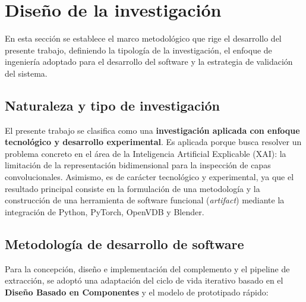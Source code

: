 \section{Diseño de la investigación}

En esta sección se establece el marco metodológico que rige el desarrollo del presente trabajo, definiendo la 
tipología de la investigación, el enfoque de ingeniería adoptado para el desarrollo del software y la estrategia 
de validación del sistema.

\subsection{Naturaleza y tipo de investigación}
El presente trabajo se clasifica como una \textbf{investigación aplicada con enfoque tecnológico y desarrollo 
experimental}. Es aplicada porque busca resolver un problema concreto en el área de la Inteligencia Artificial 
Explicable (XAI): la limitación de la representación bidimensional para la inspección de capas convolucionales. 
Asimismo, es de carácter tecnológico y experimental, ya que el resultado principal consiste en la formulación 
de una metodología y la construcción de una herramienta de software funcional (\textit{artifact}) mediante la 
integración de Python, PyTorch, OpenVDB y Blender.

\subsection{Metodología de desarrollo de software}
Para la concepción, diseño e implementación del complemento y el pipeline de extracción, se adoptó una 
adaptación del ciclo de vida iterativo basado en el \textbf{Diseño Basado en Componentes} y el modelo de 
prototipado rápido:

